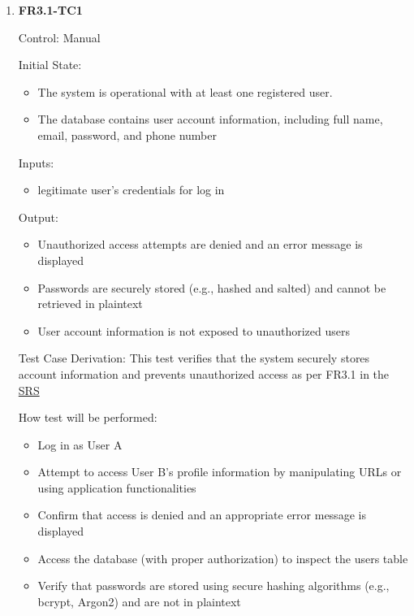 \documentclass[12pt, titlepage]{article}
\begin{document}
\begin{enumerate}
    \item{\textbf{FR3.1-TC1}}
    \hypertarget{FR3.1-TC1}{}
    
    Control: Manual
    
    Initial State:
    \begin{itemize}
        \item The system is operational with at least one registered user.
        \item The database contains user account information, including full name, email, password, and phone number
    \end{itemize}
    
    Inputs: 
    \begin{itemize}
        \item legitimate user's credentials for log in
    \end{itemize}
    
    Output: 
    \begin{itemize}
        \item Unauthorized access attempts are denied and an error message is displayed        
        \item Passwords are securely stored (e.g., hashed and salted) and cannot be retrieved in plaintext
        \item User account information is not exposed to unauthorized users
    \end{itemize}
    
    Test Case Derivation: This test verifies that the system securely stores account information and prevents unauthorized access as per FR3.1 in the \href{https://shorturl.at/FdAgR}{SRS}
    
    How test will be performed:
    \begin{itemize}
        \item Log in as User A
        \item Attempt to access User B's profile information by manipulating URLs or using application functionalities
        \item Confirm that access is denied and an appropriate error message is displayed
        \item Access the database (with proper authorization) to inspect the users table
        \item Verify that passwords are stored using secure hashing algorithms (e.g., bcrypt, Argon2) and are not in plaintext
    \end{itemize}
\end{enumerate}
\end{document}
